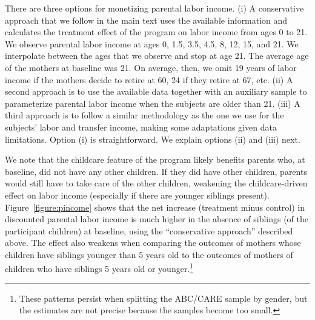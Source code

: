 \noindent There are three options for monetizing parental labor income. (i) A conservative approach that we follow in the main text uses the available information and calculates the treatment effect of the program on labor income from ages 0 to 21. We observe parental labor income at ages 0, 1.5, 3.5, 4.5, 8, 12, 15, and 21. We interpolate between the ages that we observe and stop at age 21. The average age of the mothers at baseline was 21. On average, then, we omit 19 years of labor income if the mothers decide to retire at 60, 24 if they retire at 67, etc. (ii) A second approach is to use the available data together with an auxiliary sample to parameterize parental labor income when the subjects are older than 21. (iii) A third approach is to follow a similar methodology as the one we use for the subjects' labor and transfer income, making some adaptations given data limitations. Option (i) is straightforward. We explain options (ii) and (iii) next.

\noindent We note that the childcare feature of the program likely benefits parents who, at baseline, did not have any other children. If they did have other children, parents would still have to take care of the other children, weakening the childcare-driven effect on labor income (especially if there are younger siblings present). Figure~\ref{figure:pincome} shows that the net increase (treatment minus control) in discounted parental labor income is much higher in the absence of siblings (of the participant children) at baseline, using the ``conservative approach'' described above. The effect also weakens when comparing the outcomes of mothers whose children have siblings younger than 5 years old to the outcomes of mothers of children who have siblings 5 years old or younger.\footnote{These patterns persist when splitting the ABC/CARE sample by gender, but the estimates are not precise because the samples become too small.}

